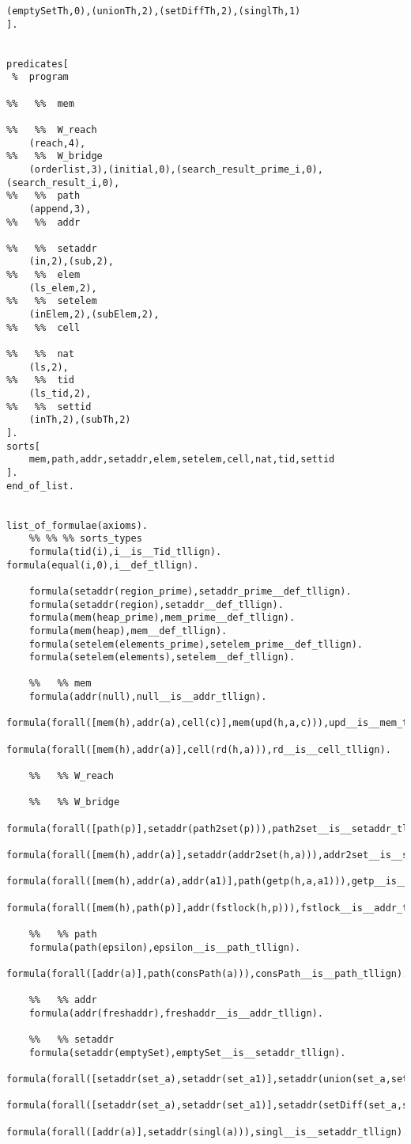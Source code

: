 \begin{lstlisting}
(emptySetTh,0),(unionTh,2),(setDiffTh,2),(singlTh,1)
].


predicates[
 %  program
    
%%   %%  mem
    
%%   %%  W_reach
    (reach,4),
%%   %%  W_bridge
    (orderlist,3),(initial,0),(search_result_prime_i,0),(search_result_i,0),
%%   %%  path
    (append,3),
%%   %%  addr
    
%%   %%  setaddr
    (in,2),(sub,2),
%%   %%  elem
    (ls_elem,2),
%%   %%  setelem
    (inElem,2),(subElem,2),
%%   %%  cell
    
%%   %%  nat
    (ls,2),
%%   %%  tid
    (ls_tid,2),
%%   %%  settid
    (inTh,2),(subTh,2)
].
sorts[
    mem,path,addr,setaddr,elem,setelem,cell,nat,tid,settid
].
end_of_list.


list_of_formulae(axioms).
    %% %% %% sorts_types
    formula(tid(i),i__is__Tid_tllign). formula(equal(i,0),i__def_tllign).

    formula(setaddr(region_prime),setaddr_prime__def_tllign).
    formula(setaddr(region),setaddr__def_tllign).
    formula(mem(heap_prime),mem_prime__def_tllign).
    formula(mem(heap),mem__def_tllign).
    formula(setelem(elements_prime),setelem_prime__def_tllign).
    formula(setelem(elements),setelem__def_tllign).

    %%   %% mem
    formula(addr(null),null__is__addr_tllign).
    formula(forall([mem(h),addr(a),cell(c)],mem(upd(h,a,c))),upd__is__mem_tllign).
    formula(forall([mem(h),addr(a)],cell(rd(h,a))),rd__is__cell_tllign).

    %%   %% W_reach

    %%   %% W_bridge
    formula(forall([path(p)],setaddr(path2set(p))),path2set__is__setaddr_tllign).
    formula(forall([mem(h),addr(a)],setaddr(addr2set(h,a))),addr2set__is__setaddr_tllign).
    formula(forall([mem(h),addr(a),addr(a1)],path(getp(h,a,a1))),getp__is__path_tllign).
    formula(forall([mem(h),path(p)],addr(fstlock(h,p))),fstlock__is__addr_tllign).

    %%   %% path
    formula(path(epsilon),epsilon__is__path_tllign).
    formula(forall([addr(a)],path(consPath(a))),consPath__is__path_tllign).

    %%   %% addr
    formula(addr(freshaddr),freshaddr__is__addr_tllign).

    %%   %% setaddr
    formula(setaddr(emptySet),emptySet__is__setaddr_tllign).
    formula(forall([setaddr(set_a),setaddr(set_a1)],setaddr(union(set_a,set_a1))),union__is__setaddr_tllign).
    formula(forall([setaddr(set_a),setaddr(set_a1)],setaddr(setDiff(set_a,set_a1))),setDiff__is__setaddr_tllign).
    formula(forall([addr(a)],setaddr(singl(a))),singl__is__setaddr_tllign).


\end{lstlisting}
